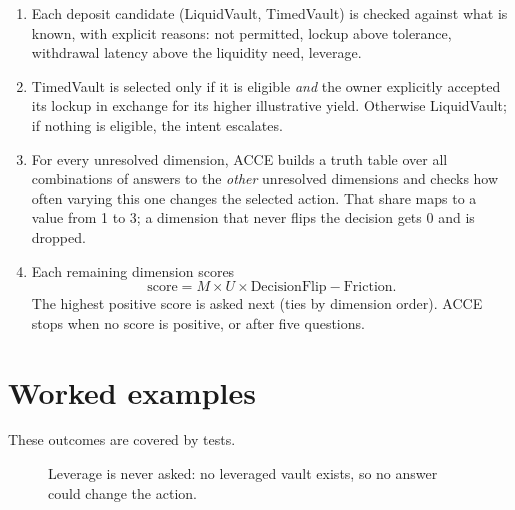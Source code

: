 \begin{enumerate}
  \item {} Each deposit candidate (LiquidVault, TimedVault) is checked against what is known, with explicit reasons: not permitted, lockup above tolerance, withdrawal latency above the liquidity need, leverage.
  \item {} TimedVault is selected only if it is eligible \emph{and} the owner explicitly accepted its lockup in exchange for its higher illustrative yield. Otherwise LiquidVault; if nothing is eligible, the intent escalates.
  \item {} For every unresolved dimension, ACCE builds a truth table over all combinations of answers to the \emph{other} unresolved dimensions and checks how often varying this one changes the selected action. That share maps to a value from 1 to 3; a dimension that never flips the decision gets 0 and is dropped.
  \item {} Each remaining dimension scores
  \[\text{score} = M \times U \times \text{DecisionFlip} - \text{Friction}.\]
  The highest positive score is asked next (ties by dimension order). ACCE stops when no score is positive, or after five questions.
\end{enumerate}

\section{Worked examples}

These outcomes are covered by tests.

\begin{figure}[htbp]
\centering
{}
\caption{Leverage is never asked: no leveraged vault exists, so no answer could change the action.}
\end{figure}
